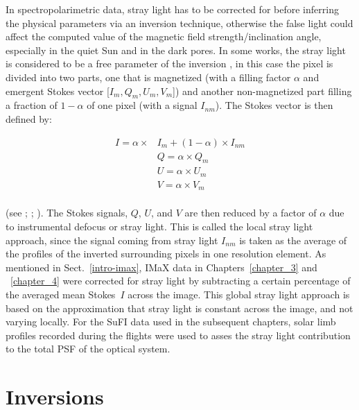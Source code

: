 \documentclass[goettingen, gauss, print]{thesis}
\begin{document}
In spectropolarimetric data, stray light has to be corrected for before inferring the physical parameters via an inversion technique, otherwise the false light could affect the computed value of the magnetic field strength/inclination angle, especially in the quiet Sun and in the dark pores. In some works, the stray light is considered to be a free parameter of the inversion \citep{orozco_suarez_quiet-sun_2007, borrero_inferring_2011}, in this case the pixel is divided into two parts, one that is magnetized (with a filling factor $\alpha$ and emergent Stokes vector [$I_m, Q_m, U_m, V_m$]) and another non-magnetized part filling a fraction of $1-\alpha$ of one pixel (with a signal $I_{nm}$). The Stokes vector is then defined by:

\begin{align}
I = \alpha \times & I_{m}+(1-\alpha)\times I_{nm} \\
& Q = \alpha \times Q_m \\
& U = \alpha \times U_m \\
& V = \alpha \times V_{m} \\
\end{align}

(see \citet{stenflo_magnetic-field_1973}; \cite{stenflo_dependence_1985}; \cite{solanki_small-scale_1993}). The Stokes signals, $Q$, $U$, and $V$ are then reduced by a factor of $\alpha$ due to instrumental defocus or stray light. This is called the local stray light approach, since the signal coming from stray light $I_{nm}$ is taken as the average of the profiles of the inverted surrounding pixels in one resolution element.
As mentioned in Sect.~\ref{intro-imax}, IMaX data in Chapters~\ref{chapter_3} and ~\ref{chapter_4} were corrected for stray light by subtracting a certain percentage of the averaged mean Stokes~$I$ across the image. This global stray light approach is based on the approximation that stray light is constant across the image, and not varying locally. For the SuFI data used in the subsequent chapters, solar limb profiles recorded during the flights were used to asses the stray light contribution to the total PSF of the optical system.  
     
\section{Inversions} %
\label{intro-inversions}
\end{document}
